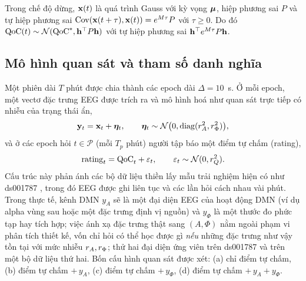 \begin{proposition}
\label{prop:p5}
Trong chế độ dừng, $\mathbf{x}(t)$ là quá trình Gauss với kỳ vọng $\boldsymbol{\mu}$, hiệp phương sai $P$ và tự hiệp phương sai $\operatorname{Cov}(\mathbf{x}(t+\tau),\mathbf{x}(t))=e^{M\tau}P$ với $\tau\ge 0$. Do đó $\mathrm{QoC}(t)\sim\mathcal N(\mathrm{QoC}^*,\mathbf{h}^\top P\mathbf{h})$ với tự hiệp phương sai $\mathbf{h}^\top e^{M\tau}P\mathbf{h}$.
\end{proposition}

\subsection{Mô hình quan sát và tham số danh nghĩa}
\label{sec:obs}

Một phiên dài $T$ phút được chia thành các epoch dài $\Delta=10$~s. Ở mỗi epoch, một vectơ đặc trưng EEG được trích ra và mô hình hoá như quan sát trực tiếp có nhiễu của trạng thái ẩn,
\begin{equation}
  \mathbf{y}_t=\mathbf{x}_t+\boldsymbol\eta_t,\qquad \boldsymbol\eta_t\sim\mathcal N\bigl(0,\operatorname{diag}(r_{A}^2,r_{\Phi}^2)\bigr),
  \label{eq:obsEEG}
\end{equation}
và ở các epoch hỏi $t\in\mathcal P$ (mỗi $T_p$ phút) người tập báo một điểm tự chấm (rating),
\begin{equation}
  \mathrm{rating}_t=\mathrm{QoC}_t+\varepsilon_t,\qquad \varepsilon_t\sim\mathcal N(0,r_{Q}^2).
  \label{eq:obsRating}
\end{equation}
Cấu trúc này phản ánh các bộ dữ liệu thiền lấy mẫu trải nghiệm hiện có như ds001787 \citep{Brandmeyer2018}, trong đó EEG được ghi liên tục và các lần hỏi cách nhau vài phút. Trong thực tế, kênh DMN $y_A$ sẽ là một đại diện EEG của hoạt động DMN (ví dụ alpha vùng sau hoặc một đặc trưng định vị nguồn) và $y_\Phi$ là một thước đo phức tạp hay tích hợp; việc ánh xạ đặc trưng thật sang $(A,\Phi)$ nằm ngoài phạm vi phân tích thiết kế, vốn chỉ hỏi có thể học được gì \emph{nếu} những đặc trưng như vậy tồn tại với mức nhiễu $r_{A},r_{\Phi}$;  thử hai đại diện ứng viên trên ds001787 và trên một bộ dữ liệu thứ hai. Bốn cấu hình quan sát được xét: (a) chỉ điểm tự chấm, (b) điểm tự chấm $+\,y_A$, (c) điểm tự chấm $+\,y_\Phi$, (d) điểm tự chấm $+\,y_A+y_\Phi$.


